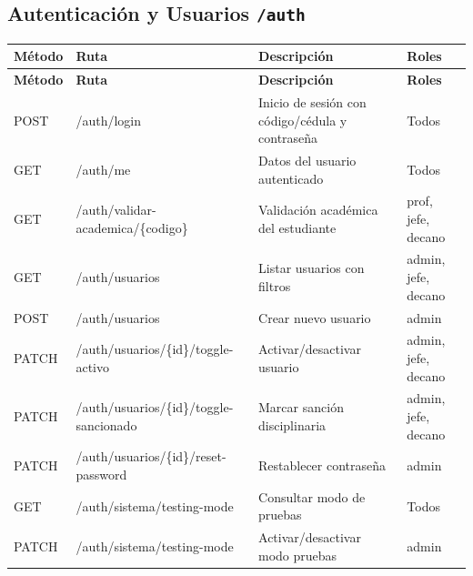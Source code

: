 \documentclass[12pt,a4paper]{article}
\begin{document}
\subsection{Autenticación y Usuarios \texttt{/auth}}
\begin{longtable}{>{\ttfamily}p{1.5cm} >{\ttfamily}p{6cm} p{4.5cm} p{2cm}}
  \toprule
  \textbf{Método} & \textbf{Ruta} & \textbf{Descripción} & \textbf{Roles} \\
  \midrule
  \endfirsthead
  \toprule
  \textbf{Método} & \textbf{Ruta} & \textbf{Descripción} & \textbf{Roles} \\
  \midrule
  \endhead
  POST   & /auth/login & Inicio de sesión con código/cédula y contraseña & Todos \\
  GET    & /auth/me & Datos del usuario autenticado & Todos \\
  GET    & /auth/validar-academica/\{codigo\} & Validación académica del estudiante & prof, jefe, decano \\
  GET    & /auth/usuarios & Listar usuarios con filtros & admin, jefe, decano \\
  POST   & /auth/usuarios & Crear nuevo usuario & admin \\
  PATCH  & /auth/usuarios/\{id\}/toggle-activo & Activar/desactivar usuario & admin, jefe, decano \\
  PATCH  & /auth/usuarios/\{id\}/toggle-sancionado & Marcar sanción disciplinaria & admin, jefe, decano \\
  PATCH  & /auth/usuarios/\{id\}/reset-password & Restablecer contraseña & admin \\
  GET    & /auth/sistema/testing-mode & Consultar modo de pruebas & Todos \\
  PATCH  & /auth/sistema/testing-mode & Activar/desactivar modo pruebas & admin \\
  \bottomrule
\end{longtable}

\end{document}
